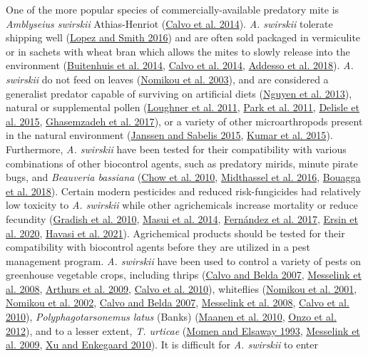 \documentclass{ufdissertation}[overrideChapters] %
\begin{document}
{One of the more popular species of commercially-available predatory mite is \emph{Amblyseius swirskii} Athias-Henriot (\protect\hyperlink{ref-Calvo2014}{Calvo et al. 2014}). \emph{A. swirskii} tolerate shipping well (\protect\hyperlink{ref-Lopez2016a}{Lopez and Smith 2016}) and are often sold packaged in vermiculite or in sachets with wheat bran which allows the mites to slowly release into the environment (\protect\hyperlink{ref-Buitenhuis2014}{Buitenhuis et al. 2014}, \protect\hyperlink{ref-Calvo2014}{Calvo et al. 2014}, \protect\hyperlink{ref-Addesso2018}{Addesso et al. 2018}). \emph{A. swirskii} do not feed on leaves (\protect\hyperlink{ref-Nomikou2003}{Nomikou et al. 2003}), and are considered a generalist predator capable of surviving on artificial diets (\protect\hyperlink{ref-Nguyen2013}{Nguyen et al. 2013}), natural or supplemental pollen (\protect\hyperlink{ref-Loughner2011}{Loughner et al. 2011}, \protect\hyperlink{ref-Park2011}{Park et al. 2011}, \protect\hyperlink{ref-Delisle2015}{Delisle et al. 2015}, \protect\hyperlink{ref-Ghasemzadeh2017}{Ghasemzadeh et al. 2017}), or a variety of other microarthropods present in the natural environment (\protect\hyperlink{ref-Janssen2015}{Janssen and Sabelis 2015}, \protect\hyperlink{ref-Kumar2015}{Kumar et al. 2015}). Furthermore, \emph{A. swirskii} have been tested for their compatibility with various combinations of other biocontrol agents, such as predatory mirids, minute pirate bugs, and \emph{Beauveria bassiana} (\protect\hyperlink{ref-Chow2010}{Chow et al. 2010}, \protect\hyperlink{ref-Midthassel2016}{Midthassel et al. 2016}, \protect\hyperlink{ref-Bouagga2018}{Bouagga et al. 2018}). Certain modern pesticides and reduced risk-fungicides had relatively low toxicity to \emph{A. swirskii} while other agrichemicals increase mortality or reduce fecundity (\protect\hyperlink{ref-Gradish2010}{Gradish et al. 2010}, \protect\hyperlink{ref-Masui2014}{Masui et al. 2014}, \protect\hyperlink{ref-Fernandez2017}{Fernández et al. 2017}, \protect\hyperlink{ref-Ersin2020}{Ersin et al. 2020}, \protect\hyperlink{ref-Havasi2021}{Havasi et al. 2021}). Agrichemical products should be tested for their compatibility with biocontrol agents before they are utilized in a pest management program. \emph{A. swirskii} have been used to control a variety of pests on greenhouse vegetable crops, including thrips (\protect\hyperlink{ref-Calvo2007}{Calvo and Belda 2007}, \protect\hyperlink{ref-Messelink2008}{Messelink et al. 2008}, \protect\hyperlink{ref-Arthurs2009}{Arthurs et al. 2009}, \protect\hyperlink{ref-Calvo2010}{Calvo et al. 2010}), whiteflies (\protect\hyperlink{ref-Nomikou2001}{Nomikou et al. 2001}, \protect\hyperlink{ref-Nomikou2002}{Nomikou et al. 2002}, \protect\hyperlink{ref-Calvo2007}{Calvo and Belda 2007}, \protect\hyperlink{ref-Messelink2008}{Messelink et al. 2008}, \protect\hyperlink{ref-Calvo2010}{Calvo et al. 2010}), \emph{Polyphagotarsonemus latus} (Banks) (\protect\hyperlink{ref-Maanen2010}{Maanen et al. 2010}, \protect\hyperlink{ref-Onzo2012}{Onzo et al. 2012}), and to a lesser extent, \emph{T. urticae} (\protect\hyperlink{ref-Momen1993}{Momen and Elsaway 1993}, \protect\hyperlink{ref-Messelink2009}{Messelink et al. 2009}, \protect\hyperlink{ref-Xu2010}{Xu and Enkegaard 2010}). It is difficult for \emph{A. swirskii} to enter }
\end{document}
